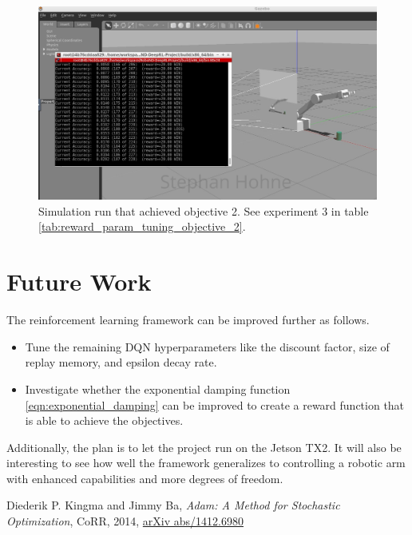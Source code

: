 \documentclass[11pt, onecolumn, oneside, reqno]{amsart}
\begin{document}
\begin{figure}[htpb]
      \centering
      \includegraphics[width=\linewidth]{images/228_signed.PNG}
      \caption{Simulation run that achieved objective 2. See experiment 3 in table \ref{tab:reward_param_tuning_objective_2}.}
      \label{fig:objective_2_achieved}
\end{figure}

\section{Future Work}
The reinforcement learning framework can be improved further as follows.
\begin{itemize}
\item Tune the remaining DQN hyperparameters like the discount factor, size of replay memory, and epsilon decay rate.
\item Investigate whether the exponential damping function \ref{eqn:exponential_damping} can be improved to create a reward function that is able to achieve the objectives. 
\end{itemize}

Additionally, the plan is to let the project run on the Jetson TX2. It will also be interesting to see how well the framework generalizes to controlling a robotic arm with enhanced capabilities and more degrees of freedom.

\begin{thebibliography}{1}
Diederik P. Kingma and Jimmy Ba, \textit{Adam: {A} Method for Stochastic Optimization}, CoRR, 2014, \href{http://arxiv.org/abs/1412.6980}{arXiv  abs/1412.6980}
\end{thebibliography}
\end{document}
